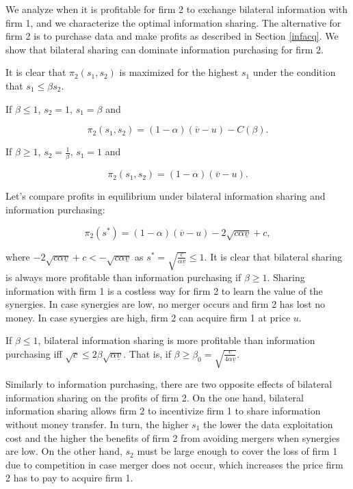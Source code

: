 \documentclass[a4paper,leqno]{article}%
\renewcommand{\a}{\alpha}
\newcommand{\uv}{\underline{v}}
\newcommand{\ov}{\overline{v}}
\begin{document}
We analyze when it is profitable for firm 2 to exchange bilateral information with firm 1, and we characterize the optimal information sharing. The alternative for firm 2 is to purchase data and make profits as described in Section \ref{infacq}. We show that bilateral sharing can dominate information purchasing for firm $2$. 

\medskip

It is clear that $\pi_2(s_1,s_2)$ is maximized for the highest $s_1$ under the condition that $s_1\leq \beta s_2$. 


If $\beta\leq 1$, $s_2=1$, $s_1=\beta$ and

        $$\pi_2(s_1,s_2)=(1-\a)(\ov-u)-C(\beta).$$

If $\beta\geq 1$, $s_2=\frac{1}{\beta}$, $s_1=1$ and

        $$\pi_2(s_1,s_2)=(1-\a)(\ov-u).$$

\medskip

Let's compare profits in equilibrium under bilateral information sharing and information purchasing:

$$\pi_2(s^*)=(1-\a)(\ov-u)-2\sqrt{c\a \uv}+c,$$

\noindent where $-2\sqrt{c\a \uv}+c<-\sqrt{c\a \uv}$ as $s^*=\sqrt{\frac{c}{\a\uv}}\leq 1$. It is clear that bilateral sharing is always more profitable than information purchasing if $\beta\geq1$. Sharing information with firm 1 is a costless way for firm 2 to learn the value of the synergies. In case synergies are low, no merger occurs and firm 2 has lost no money. In case synergies are high, firm 2 can acquire firm 1 at price $u$.

\medskip

If $\beta\leq1$, bilateral information sharing is more profitable than information purchasing iff $\sqrt{c}\leq 2\beta \sqrt{\a \uv}$. That is, if $\beta\geq\beta_0=\sqrt{\frac{c}{4\a \uv}}$.

\medskip

%
Similarly to information purchasing, there are two opposite effects of bilateral information sharing on the profits of firm 2. On the one hand, bilateral information sharing allows firm 2 to incentivize firm 1 to share information without money transfer. In turn, the higher $s_1$ the lower the data exploitation cost and the higher the benefits of firm 2 from avoiding mergers when synergies are low. On the other hand, $s_2$ must be large enough to cover the loss of firm 1 due to competition in case merger does not occur, which increases the price firm 2 has to pay to acquire firm 1. 
\end{document}
